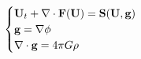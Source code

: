 \documentclass[preview]{standalone}
\begin{document}
\begin{align*}
\special{dvisvgm:raw <g id='unique000'>}
            \begin{cases}
            \mathbf{U}_t + \nabla\cdot\mathbf{F}(\mathbf{U}) = \mathbf{S}(\mathbf{U},\mathbf{g}) \\
            \mathbf{g} = \nabla\phi \\
            \nabla\cdot\mathbf{g} = 4\pi G \rho
            \end{cases}
            \special{dvisvgm:raw </g>}
\end{align*}
\end{document}
